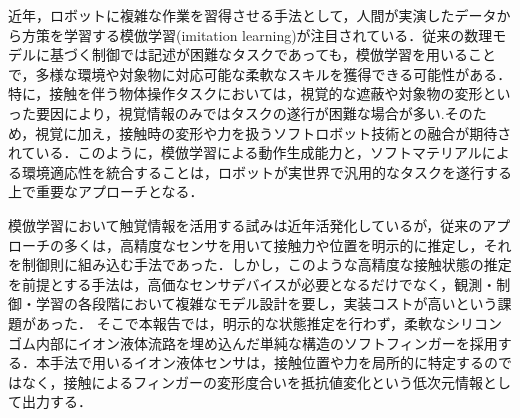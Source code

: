 近年，ロボットに複雑な作業を習得させる手法として，人間が実演したデータから方策を学習する模倣学習(imitation learning)が注目されている\cite{schaalLearningDemonstration1996,an2026dexterous,ravichandarRecentAdvancesRobot2020}．従来の数理モデルに基づく制御では記述が困難なタスクであっても，模倣学習を用いることで，多様な環境や対象物に対応可能な柔軟なスキルを獲得できる可能性がある\cite{ShanGenBairateraruZhiYuniJidukuMoFangXueXiniyoruSanCiYuanQuMianShikiDongZuonoXueXi2023}．特に，接触を伴う物体操作タスクにおいては，視覚的な遮蔽や対象物の変形といった要因により，視覚情報のみではタスクの遂行が困難な場合が多い\cite{zhuDeformableFragileObject2025}.そのため，視覚に加え，接触時の変形や力を扱うソフトロボット技術との融合が期待されている\cite{chenDataDrivenMethodsApplied2025,chiRecentProgressTechnologies2018,dahiyaTactileSensingHumans2010a,hanOverviewDevelopmentFlexible2017a,shintakeSoftRoboticGrippers2018}．このように，模倣学習による動作生成能力と，ソフトマテリアルによる環境適応性を統合することは，ロボットが実世界で汎用的なタスクを遂行する上で重要なアプローチとなる．\par
模倣学習において触覚情報を活用する試みは近年活発化している\cite{zhaoLearningFineGrainedBimanual2023,eljuriHapticInformedACTSoft2025}が，従来のアプローチの多くは，高精度なセンサを用いて接触力や位置を明示的に推定し，それを制御則に組み込む手法であった．しかし，このような高精度な接触状態の推定を前提とする手法は，高価なセンサデバイスが必要となるだけでなく，観測・制御・学習の各段階において複雑なモデル設計を要し，実装コストが高いという課題があった．
そこで本報告では，明示的な状態推定を行わず，柔軟なシリコンゴム内部にイオン液体流路を埋め込んだ単純な構造のソフトフィンガー\cite{ohashiSoftTactileSensors2023}を採用する．本手法で用いるイオン液体センサは，接触位置や力を局所的に特定するのではなく，接触によるフィンガーの変形度合いを抵抗値変化という低次元情報として出力する．\par


